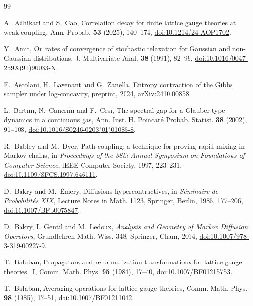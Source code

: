 \documentclass[aps,prd,twocolumn,superscriptaddress,nofootinbib,longbibliography,floatfix,amsmath,amssymb,10pt]{revtex4-2}
\theoremstyle{definition}
\theoremstyle{remark}
\begin{document}
\begin{thebibliography}{99}\raggedright\advance\leftskip{}

A.~Adhikari and S.~Cao, Correlation decay for finite lattice gauge theories at weak coupling, Ann. Probab. \textbf{53} (2025), 140--174, \href{https://doi.org/10.1214/24-AOP1702}{doi:10.1214/24-AOP1702}.

Y.~Amit, On rates of convergence of stochastic relaxation for Gaussian and
non-Gaussian distributions, J. Multivariate Anal. \textbf{38} (1991),
82--99,
\href{https://doi.org/10.1016/0047-259X(91)90033-X}{doi:10.1016/0047-259X(91)90033-X}.

F.~Ascolani, H.~Lavenant and G.~Zanella, Entropy contraction of the Gibbs
sampler under log-concavity, preprint, 2024,
\href{https://arxiv.org/abs/2410.00858}{arXiv:2410.00858}.

L.~Bertini, N.~Cancrini and F.~Cesi, The spectral gap for a Glauber-type
dynamics in a continuous gas, Ann. Inst. H. Poincar\'e Probab. Statist.
\textbf{38} (2002), 91--108,
\href{https://doi.org/10.1016/S0246-0203(01)01085-8}{doi:10.1016/S0246-0203(01)01085-8}.

R.~Bubley and M.~Dyer, Path coupling: a technique for proving rapid mixing in
Markov chains, in \emph{Proceedings of the 38th Annual Symposium on
Foundations of Computer Science}, IEEE Computer Society, 1997, 223--231,
\href{https://doi.org/10.1109/SFCS.1997.646111}{doi:10.1109/SFCS.1997.646111}.

D.~Bakry and M.~\'Emery, Diffusions hypercontractives, in \emph{S\'eminaire
de Probabilit\'es XIX}, Lecture Notes in Math. 1123, Springer, Berlin, 1985,
177--206, \href{https://doi.org/10.1007/BFb0075847}{doi:10.1007/BFb0075847}.

D.~Bakry, I.~Gentil and M.~Ledoux, \emph{Analysis and Geometry of Markov
Diffusion Operators}, Grundlehren Math. Wiss. 348, Springer, Cham, 2014,
\href{https://doi.org/10.1007/978-3-319-00227-9}{doi:10.1007/978-3-319-00227-9}.

T.~Ba{\l}aban, Propagators and renormalization transformations for lattice
gauge theories.~I, Comm. Math. Phys. \textbf{95} (1984), 17--40,
\href{https://doi.org/10.1007/BF01215753}{doi:10.1007/BF01215753}.

T.~Ba{\l}aban, Averaging operations for lattice gauge theories, Comm. Math.
Phys. \textbf{98} (1985), 17--51,
\href{https://doi.org/10.1007/BF01211042}{doi:10.1007/BF01211042}.


\end{thebibliography}
\end{document}
